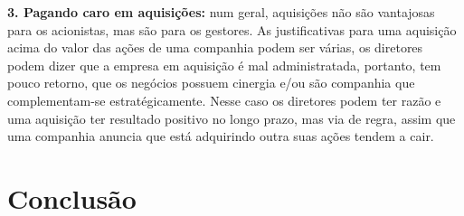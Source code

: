 \textbf{3. Pagando caro em aquisições:} num geral, aquisições não são vantajosas para os acionistas, mas são para os gestores. As justificativas para uma aquisição acima do valor das ações de uma companhia podem ser várias, os diretores podem dizer que a empresa em aquisição é mal administratada, portanto, tem pouco retorno, que os negócios possuem cinergia e/ou são companhia que complementam-se estratégicamente. Nesse caso os diretores podem ter razão e uma aquisição ter resultado positivo no longo prazo, mas via de regra, assim que uma companhia anuncia que está adquirindo outra suas ações tendem a cair.
\section{Conclusão}
